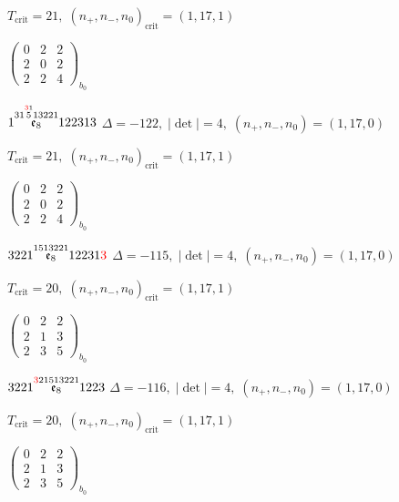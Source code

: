 \documentclass[10pt]{article}
\begin{document}
\hspace{1em}$T_{\text{crit}}=21,\; (n_+,n_-,n_0)_{\text{crit}}=(1,17,1)$

\hspace{2em}$\left(\begin{smallmatrix}0 & 2 & 2 \\ 2 & 0 & 2 \\ 2 & 2 & 4\end{smallmatrix}\right)_{\!b_0}$

\smallskip

$1\overset{31\overset{\textcolor{red}{3}1}{5}13221}{\mathfrak{e}_8}122313$ \quad $\Delta=-122,\; |\det|=4,\; (n_+,n_-,n_0)=(1,17,0)$

\hspace{1em}$T_{\text{crit}}=21,\; (n_+,n_-,n_0)_{\text{crit}}=(1,17,1)$

\hspace{2em}$\left(\begin{smallmatrix}0 & 2 & 2 \\ 2 & 0 & 2 \\ 2 & 2 & 4\end{smallmatrix}\right)_{\!b_0}$

\smallskip

$3221\overset{1513221}{\mathfrak{e}_8}12231\textcolor{red}{3}$ \quad $\Delta=-115,\; |\det|=4,\; (n_+,n_-,n_0)=(1,17,0)$

\hspace{1em}$T_{\text{crit}}=20,\; (n_+,n_-,n_0)_{\text{crit}}=(1,17,1)$

\hspace{2em}$\left(\begin{smallmatrix}0 & 2 & 2 \\ 2 & 1 & 3 \\ 2 & 3 & 5\end{smallmatrix}\right)_{\!b_0}$

\smallskip

$3221\overset{\textcolor{red}{3}21513221}{\mathfrak{e}_8}1223$ \quad $\Delta=-116,\; |\det|=4,\; (n_+,n_-,n_0)=(1,17,0)$

\hspace{1em}$T_{\text{crit}}=20,\; (n_+,n_-,n_0)_{\text{crit}}=(1,17,1)$

\hspace{2em}$\left(\begin{smallmatrix}0 & 2 & 2 \\ 2 & 1 & 3 \\ 2 & 3 & 5\end{smallmatrix}\right)_{\!b_0}$
\end{document}
